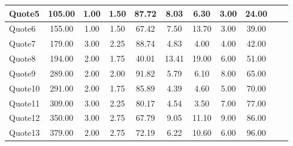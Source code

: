 \documentclass[11pt]{article}
\begin{document}
\begin{table}[htbp]
{\begin{tabular}{|p{2cm}|c|c|c|c|c|c|c|c|c|c|}
Quote5          & 105.00          & 1.00                       & \cellcolor[HTML]{D9EAD3}1.50                & 87.72                     & 8.03                      & 6.30                      & 3.00                         & 24.00                                 \\ \hline

Quote6 & 155.00          & 1.00                       & \cellcolor[HTML]{D9EAD3}1.50                & 67.42                     & 7.50                      & 13.70                     & 3.00                         & 39.00                                                \\ \hline
Quote7 & 179.00          & 3.00                       & \cellcolor[HTML]{FFF2CC}2.25                & 88.74                     & 4.83                      & 4.00                      & 4.00                         & 42.00                                         \\ \hline
Quote8 & 194.00          & 2.00                       & \cellcolor[HTML]{FFF2CC}1.75                & 40.01                     & 13.41                     & 19.00                     & 6.00                         & 51.00                                                \\ \hline
Quote9 & 289.00          & 2.00                       & \cellcolor[HTML]{FFF2CC}2.00                & 91.82                     & 5.79                      & 6.10                      & 8.00                         & 65.00                                      \\ \hline
Quote10 & 291.00          & 2.00                       & \cellcolor[HTML]{FFF2CC}1.75                & 85.89                     & 4.39                      & 4.60                      & 5.00                         & 70.00                                     \\ \hline
Quote11 & 309.00          & 3.00                       & \cellcolor[HTML]{FFF2CC}2.25                & 80.17                     & 4.54                      & 3.50                      & 7.00                         & 77.00                                          \\ \hline
Quote12 & 350.00          & 3.00                       & \cellcolor[HTML]{FCE5CD}2.75                & 67.79                     & 9.05                      & 11.10                     & 9.00                         & 86.00                                     \\ \hline
Quote13 & 379.00          & 2.00                       & \cellcolor[HTML]{FCE5CD}2.75                & 72.19                     & 6.22                      & 10.60                     & 6.00                         & 96.00                                              \\ \hline

\end{tabular}}
\end{table}
\end{document}
